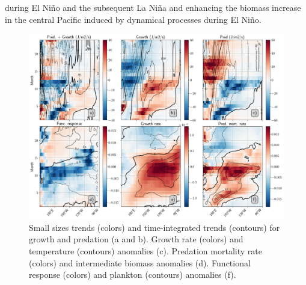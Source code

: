 during El Niño and the subsequent La Niña and enhancing the biomass increase in the central Pacific induced by dynamical processes during El Niño.  

\begin{figure}[h!tp]
	\centering
	\includegraphics[scale=0.4]{figs/fig8.png}	
	\caption{Small sizes trends (colors) and time-integrated trends (contours) for growth and predation (a and b). Growth rate (colors) and temperature (contours) anomalies (c). Predation mortality rate (colors) and intermediate biomass anomalies (d). Functional response (colors) and plankton (contours) anomalies (f).}
	\label{fig:fig8}
\end{figure}

